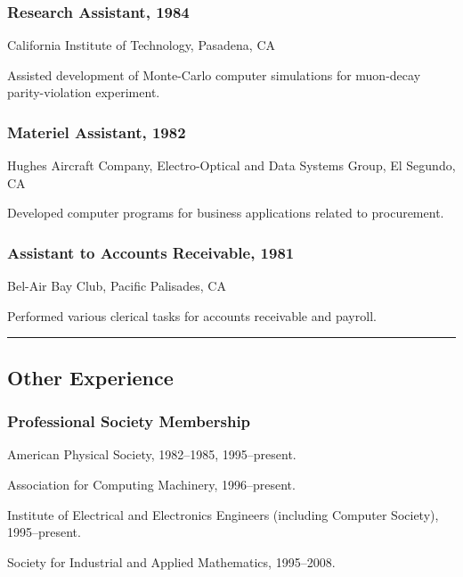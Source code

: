\documentclass[]{article}
\begin{document}
\subsubsection{Research Assistant, 1984}\label{research-assistant-1984}

California Institute of Technology, Pasadena, CA

Assisted development of Monte-Carlo computer simulations for muon-decay
parity-violation experiment.

\subsubsection{Materiel Assistant, 1982}\label{materiel-assistant-1982}

Hughes Aircraft Company, Electro-Optical and Data Systems Group, El
Segundo, CA

Developed computer programs for business applications related to
procurement.

\subsubsection{Assistant to Accounts Receivable,
1981}\label{assistant-to-accounts-receivable-1981}

Bel-Air Bay Club, Pacific Palisades, CA

Performed various clerical tasks for accounts receivable and payroll.

\begin{center}\rule{3in}{0.4pt}\end{center}

\subsection{Other Experience}\label{other-experience}

\subsubsection{Professional Society
Membership}\label{professional-society-membership}

American Physical Society, 1982--1985, 1995--present.

Association for Computing Machinery, 1996--present.

Institute of Electrical and Electronics Engineers (including Computer
Society), 1995--present.

Society for Industrial and Applied Mathematics, 1995--2008.
\end{document}
